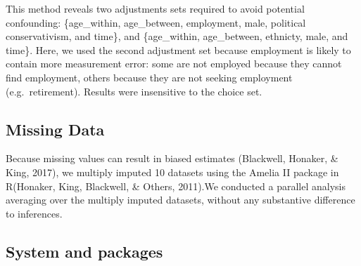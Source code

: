 \documentclass[
  english,
  man,floatsintext]{apa6}
\begin{document}
This method reveals two adjustments sets required to avoid potential confounding: \{age\_within, age\_between, employment, male, political conservativism, and time\}, and \{age\_within, age\_between, ethnicty, male, and time\}. Here, we used the second adjustment set because employment is likely to contain more measurement error: some are not employed because they cannot find employment, others because they are not seeking employment (e.g.~retirement). Results were insensitive to the choice set.

\hypertarget{missing-data}{%
\subsection{Missing Data}\label{missing-data}}

Because missing values can result in biased estimates (Blackwell, Honaker, \& King, 2017), we multiply imputed 10 datasets using the Amelia II package in R(Honaker, King, Blackwell, \& Others, 2011).We conducted a parallel analysis averaging over the multiply imputed datasets, without any substantive difference to inferences.

\hypertarget{system-and-packages}{%
\subsection{System and packages}\label{system-and-packages}}
\end{document}
